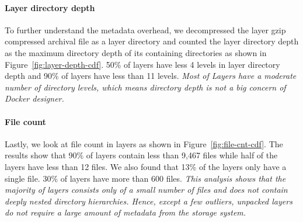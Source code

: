 \paragraph{Layer directory depth}

To further understand the metadata overhead, we decompressed the layer gzip
compressed archival file as a layer directory and counted the layer directory
depth as the maximum directory depth of its containing directories as shown in
Figure~\ref{fig:layer-depth-cdf}.
%
50\% of layers have less 4 levels in layer directory depth and 90\% of layers
have less than 11 levels.
%
\emph{Most of Layers have a moderate number of directory levels, which means
directory depth is not a big concern of Docker designer.}

\paragraph{File count}



Lastly, we look at file count in layers as shown in
Figure~\ref{fig:file-cnt-cdf}.
%
%
The results show that 90\% of layers contain less than 9,467 files while half
of the layers have less than 12 files.
%
We also found that 13\% of the layers only have a single file.
%
30\% of layers have more than 600 files.
%
\emph{This analysis shows that the majority of layers consists only of a small
number of files and does not contain deeply nested directory hierarchies.
%
Hence, except a few outliers, unpacked layers do not require a large amount of
metadata from the storage system.}

